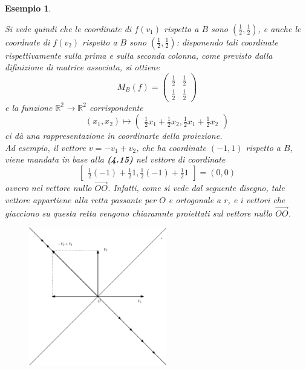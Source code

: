 \documentclass{book}
\newtheorem{esempio}{Esempio}
\begin{document}
\begin{esempio}
\begin{enumerate}
\begin{figure}[th]
    \end{figure}
    Si vede quindi che le coordinate di $f(v_1)$ rispetto a $B$ sono $\left(\frac{1}{2},\frac{1}{2}\right)$, e
    anche le coordnate di $f(v_2)$ rispetto a $B$ sono $\left(\frac{1}{2},\frac{1}{2}\right)$: disponendo tali
    coordinate rispettivamente sulla prima e sulla seconda colonna, come previsto dalla difinizione di matrice
    associata, si ottiene
    \begin{equation*}
      M_B(f)=
      \begin{pmatrix}
        \frac{1}{2}&\frac{1}{2}\\
        \frac{1}{2} & \frac{1}{2}
      \end{pmatrix}
    \end{equation*}
    e la funzione $\mathds{R^2}\to \mathds{R}^2$ corrispondente
    \begin{equation}
      (x_1,x_2)\mapsto
      \begin{pmatrix}
        \frac{1}{2}x_1+\frac{1}{2}x_2, \frac{1}{2}x_1+\frac{1}{2}x_2
      \end{pmatrix}
    \end{equation}
    ci dà una rappresentazione in coordinarte della proiezione.\\
    Ad esempio, il vettore $v=-v_1+v_2$, che ha coordinate $(-1,1)$ rispetto a $B$, viene mandata in base alla
    \textbf{(4.15)} nel vettore di coordinate
    \begin{equation*}
      \begin{bmatrix}
        \frac{1}{2}(-1)+\frac{1}{2}1, \frac{1}{2}(-1)+\frac{1}{2}1
      \end{bmatrix}=(0,0)
    \end{equation*}
    ovvero nel vettore nullo $\vec{OO}$. Infatti, come si vede dal seguente disegno, tale vettore appartiene
    alla retta passante per $O$ e ortogonale a $r$, e i vettori che giacciono su questa retta vengono chiaramnte
    proiettati sul vettore nullo $\vec{OO}$.
    \begin{figure}[th]
      \centering
        \includegraphics[width=6cm]{img/finiti/imgex4-3-7.eps}

\end{figure}
\end{enumerate}
\end{esempio}
\end{document}
